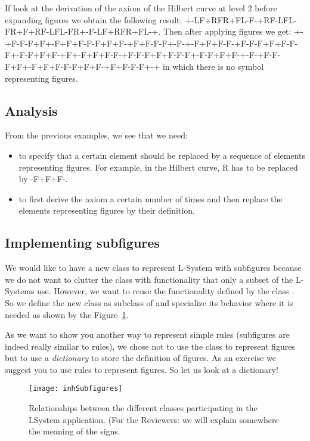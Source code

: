 If look at the derivation of the axiom of the Hilbert curve at level 2
before expanding figures we obtain the following result:
+-LF+RFR+FL-F-+RF-LFL-FR+F+RF-LFL-FR+-F-LF+RFR+FL-+. Then after
applying figures we get:
+-+F-F-F+F+-F+F+F-F-F+F+F-+F+F-F-F+-F-+-F+F+F-F-+F-F-F+F+F-F-F+-F-F+F+F-+F+-F+F+F-F-+F-F-F+F+F-F-F+-F-F+F+F-+-F-+F-F-F+F+-F+F+F-F-F+F+F-+F+F-F-F+-+
in which there is no symbol representing figures.




\subsection{Analysis}
From the previous examples, we see that we need:

\begin{itemize}
\item to specify that a certain element should be replaced by a 
sequence of elements representing figures. For example, in the
Hilbert curve, R has to be replaced by -F+F+F-.

\item to first derive the axiom a certain number of times and then replace the elements representing figures by their definition.
\end{itemize}

\subsection{Implementing subfigures}

We would like to have a new class to represent L-System with
subfigures because we do not want to clutter the  class
with functionality that only a subset of the L-Systems use. However,
we want to reuse the functionality defined by the class .
So we define the new class as subclass of  and specialize
its behavior where it is needed as shown by the
Figure~\ref{fig:inhSubfigures}.

As we want to show you another way to represent simple rules
(subfigures are indeed really similar to rules), we chose not to use
the  class to represent figures but to use a
\emph{dictionary} to store the definition of figures. As an exercise
we suggest you to use rules to represent figures. So let us look at a
dictionary!


\begin{figure}[!htbp]
\centerline{\texttt{[image: inhSubfigures]}}
\caption{Relationships between the different classes participating in the LSystem application. (For the Reviewers: we will explain somewhere the meaning of the signs.}
\label{fig:inhSubfigures}
\end{figure}


